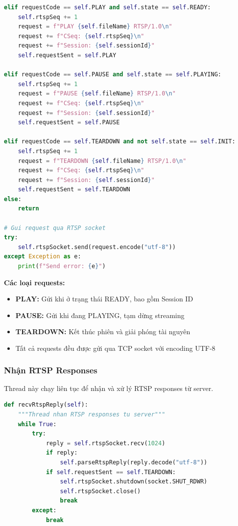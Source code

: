 \documentclass[a4paper,12pt]{article}
\begin{document}
\begin{lstlisting}[language=Python, caption={Send RTSP Request - PLAY/PAUSE/TEARDOWN}]
elif requestCode == self.PLAY and self.state == self.READY:
    self.rtspSeq += 1
    request = f"PLAY {self.fileName} RTSP/1.0\n"
    request += f"CSeq: {self.rtspSeq}\n"
    request += f"Session: {self.sessionId}"
    self.requestSent = self.PLAY

elif requestCode == self.PAUSE and self.state == self.PLAYING:
    self.rtspSeq += 1
    request = f"PAUSE {self.fileName} RTSP/1.0\n"
    request += f"CSeq: {self.rtspSeq}\n"
    request += f"Session: {self.sessionId}"
    self.requestSent = self.PAUSE

elif requestCode == self.TEARDOWN and not self.state == self.INIT:
    self.rtspSeq += 1
    request = f"TEARDOWN {self.fileName} RTSP/1.0\n"
    request += f"CSeq: {self.rtspSeq}\n"
    request += f"Session: {self.sessionId}"
    self.requestSent = self.TEARDOWN
else:
    return

# Gui request qua RTSP socket
try:
    self.rtspSocket.send(request.encode("utf-8"))
except Exception as e:
    print(f"Send error: {e}")
\end{lstlisting}

\textbf{Các loại requests:}
\begin{itemize}
    \item \textbf{PLAY:} Gửi khi ở trạng thái READY, bao gồm Session ID
    \item \textbf{PAUSE:} Gửi khi đang PLAYING, tạm dừng streaming
    \item \textbf{TEARDOWN:} Kết thúc phiên và giải phóng tài nguyên
    \item Tất cả requests đều được gửi qua TCP socket với encoding UTF-8
\end{itemize}

\subsubsection{Nhận RTSP Responses}

Thread này chạy liên tục để nhận và xử lý RTSP responses từ server.

\begin{lstlisting}[language=Python, caption={Receive RTSP Reply Thread}]
def recvRtspReply(self):
    """Thread nhan RTSP responses tu server"""
    while True:
        try:
            reply = self.rtspSocket.recv(1024)
            if reply:
                self.parseRtspReply(reply.decode("utf-8"))
            if self.requestSent == self.TEARDOWN:
                self.rtspSocket.shutdown(socket.SHUT_RDWR)
                self.rtspSocket.close()
                break
        except:
            break
\end{lstlisting}
\end{document}
